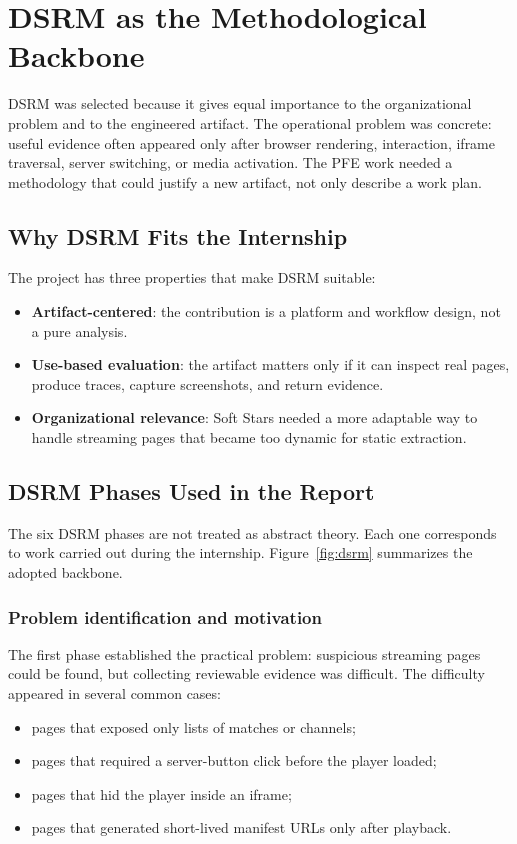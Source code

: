 \section{DSRM as the Methodological Backbone}

DSRM was selected because it gives equal importance to the organizational problem and
to the engineered artifact. The operational problem was concrete: useful evidence often
appeared only after browser rendering, interaction, iframe traversal, server switching,
or media activation. The PFE work needed a methodology that could justify a new
artifact, not only describe a work plan.



\subsection{Why DSRM Fits the Internship}

The project has three properties that make DSRM suitable:
\begin{itemize}
  \item \textbf{Artifact-centered}: the contribution is a platform and workflow design,
  not a pure analysis.
  \item \textbf{Use-based evaluation}: the artifact matters only if it can inspect real
  pages, produce traces, capture screenshots, and return evidence.
  \item \textbf{Organizational relevance}: Soft Stars needed a more adaptable way to
  handle streaming pages that became too dynamic for static extraction.
\end{itemize}

\subsection{DSRM Phases Used in the Report}

The six DSRM phases are not treated as abstract theory. Each one corresponds to work
carried out during the internship. Figure~\ref{fig:dsrm} summarizes the adopted
backbone.



\subsubsection{Problem identification and motivation}

The first phase established the practical problem: suspicious streaming pages could be
found, but collecting reviewable evidence was difficult. The difficulty appeared in
several common cases:
\begin{itemize}
  \item pages that exposed only lists of matches or channels;
  \item pages that required a server-button click before the player loaded;
  \item pages that hid the player inside an iframe;
  \item pages that generated short-lived manifest URLs only after playback.
\end{itemize}

